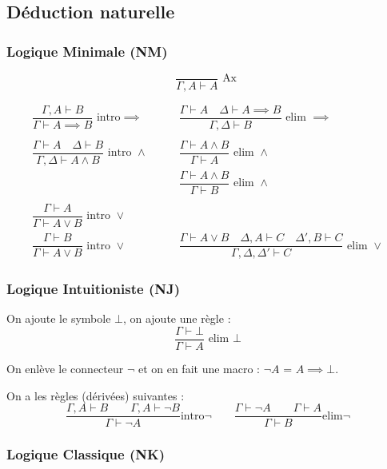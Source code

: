 \documentclass[french]{article}
\begin{document}
\subsection{Déduction naturelle}

\subsubsection{Logique Minimale (NM)}

\[\dfrac{}{\Gamma,A\vdash A} \text{ Ax }\]

\begin{align*}
\dfrac{\Gamma ,A\vdash B}{\Gamma\vdash A\implies B} \text{ intro} \implies &\qquad 
\dfrac{\Gamma\vdash A \quad \Delta\vdash A\implies B}{\Gamma ,\Delta\vdash B} \text{ elim }\implies \\ 
\\
\dfrac{\Gamma\vdash A \quad \Delta \vdash B}{\Gamma, \Delta \vdash A\land B} \text{ intro } \land  &\qquad 
\dfrac{\Gamma\vdash A \land B}{\Gamma \vdash A} \text{ elim }\land \\
&\qquad \dfrac{\Gamma\vdash A \land B}{\Gamma \vdash B} \text{ elim }\land  \\
\\
\dfrac{\Gamma\vdash A}{\Gamma \vdash A \lor B} \text{ intro }\lor &\qquad \\
\dfrac{\Gamma\vdash B}{\Gamma \vdash A \lor B} \text{ intro }\lor 
&\qquad \dfrac{\Gamma\vdash A \lor B \quad \Delta,A \vdash C \quad \Delta',B \vdash C}{\Gamma, \Delta, \Delta' \vdash C} \text{ elim }\lor 
\end{align*}

\subsubsection{Logique Intuitioniste (NJ)}

On ajoute le symbole $\bot$, on ajoute une règle :
\[\dfrac{\Gamma\vdash\bot}{\Gamma\vdash A}\text{ elim }\bot\]

On enlève le connecteur $\neg$ et on en fait une macro : $\neg A$ = $A\implies\bot$.

On a les règles (dérivées) suivantes :
$$\frac{\Gamma, A\vdash B\qquad \Gamma, A\vdash\neg B}{\Gamma\vdash\neg A}\text{intro}\neg\qquad \frac{\Gamma\vdash\neg A\qquad \Gamma\vdash A}{\Gamma\vdash B}\text{elim}\neg$$


\subsubsection{Logique Classique (NK)}
\end{document}
